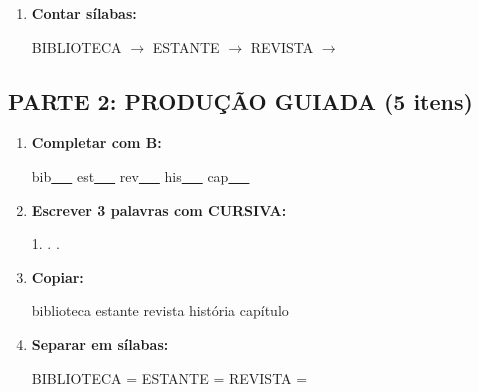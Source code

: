 \begin{exercicio}
\begin{enumerate}
  \item \textbf{Contar sílabas:}
  \begin{center}
  BIBLIOTECA $\rightarrow$ \underline{\hspace{0.9cm}} \quad ESTANTE $\rightarrow$ \underline{\hspace{0.9cm}} \quad REVISTA $\rightarrow$ \underline{\hspace{0.9cm}}
  \end{center}

\end{enumerate}

\subsection*{PARTE 2: PRODUÇÃO GUIADA (5 itens)}

\begin{enumerate}[resume]

  \item \textbf{Completar com B:}
  \begin{center}
  bib\underline{~~~} \quad est\underline{~~~} \quad rev\underline{~~~} \quad his\underline{~~~} \quad cap\underline{~~~}
  \end{center}

  \item \textbf{Escrever 3 palavras com CURSIVA:}
  \begin{center}
  1. \underline{\hspace{3cm}} . \underline{\hspace{3cm}} . \underline{\hspace{3cm}}
  \end{center}

  \item \textbf{Copiar:}
  \begin{center}
  biblioteca \quad estante \quad revista \quad história \quad capítulo
  \end{center}

  \item \textbf{Separar em sílabas:}
  \begin{center}
  BIBLIOTECA = \underline{\hspace{1cm}} \underline{\hspace{1cm}} \quad ESTANTE = \underline{\hspace{1cm}} \underline{\hspace{1cm}} \quad REVISTA = \underline{\hspace{1cm}} \underline{\hspace{1cm}}
  \end{center}


\end{enumerate}
\end{exercicio}
